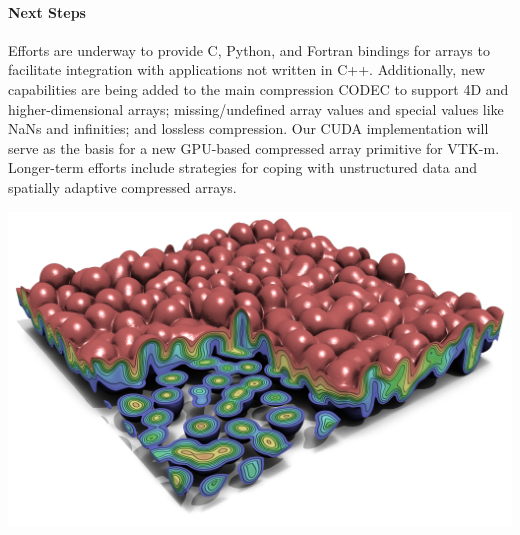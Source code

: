 \noindent
\begin{minipage}[t]{3.75in}
\paragraph{Next Steps}

Efforts are underway to provide C, Python, and Fortran bindings for
{\zfp} arrays to facilitate integration with applications not written in
C++.  Additionally, new capabilities are being added to the main compression
CODEC to support 4D and higher-dimensional arrays; missing/undefined array
values and special values like NaNs and infinities; and lossless compression.
Our CUDA implementation will serve as the basis for a new GPU-based
compressed array primitive for VTK-m.  Longer-term efforts include
strategies for coping with unstructured data and spatially adaptive
compressed arrays.
\end{minipage}%
\hspace*{0.125in}%
\begin{minipage}[t]{2.625in}
\vspace{0pt}%
\vspace{-3ex}%
\includegraphics[width=\columnwidth]{projects/2.3.4-DataViz/2.3.4.11-ZFP/ZFP}%
\vspace{-2ex}%
%
\label{fig:zfp-result}%
\end{minipage}
